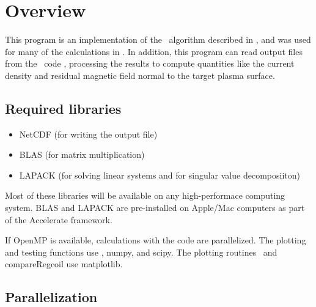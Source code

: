 \chapter{Overview}

This program is an implementation of the \regcoil~algorithm described in \cite{regcoilPaper},
and was used for many of the calculations in \cite{regcoilPaper}.
In addition, this program can read output files from the \nescoil~code \cite{nescoil},
processing the results to compute quantities like the current density
and residual magnetic field normal to the target plasma surface.





\section{Required libraries}

\begin{itemize}

\item {\ttfamily NetCDF} (for writing the output file)
\item {\ttfamily BLAS} (for matrix multiplication)
\item {\ttfamily LAPACK} (for solving linear systems and for singular value decomposiiton)

\end{itemize}

Most of these libraries will be available on any high-performace computing system. {\ttfamily BLAS} and {\ttfamily LAPACK}
are pre-installed on Apple/Mac computers as part of the Accelerate framework.

If {\ttfamily OpenMP} is available, calculations with the code are parallelized.
The plotting and testing functions use \python,
{\ttfamily numpy}, and {\ttfamily scipy}.
The plotting routines \regcoilPlot~and {\ttfamily compareRegcoil} use {\ttfamily matplotlib}.

\section{Parallelization}

